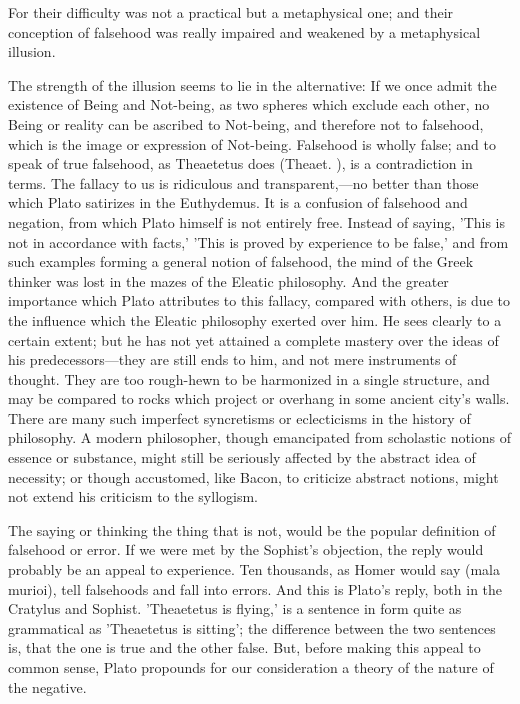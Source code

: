 \documentclass[11pt,letter]{article}
\begin{document}
\par  For their difficulty was not a practical but a metaphysical one; and their conception of falsehood was really impaired and weakened by a metaphysical illusion.

\par  The strength of the illusion seems to lie in the alternative: If we once admit the existence of Being and Not-being, as two spheres which exclude each other, no Being or reality can be ascribed to Not-being, and therefore not to falsehood, which is the image or expression of Not-being. Falsehood is wholly false; and to speak of true falsehood, as Theaetetus does (Theaet. ), is a contradiction in terms. The fallacy to us is ridiculous and transparent,—no better than those which Plato satirizes in the Euthydemus. It is a confusion of falsehood and negation, from which Plato himself is not entirely free. Instead of saying, 'This is not in accordance with facts,' 'This is proved by experience to be false,' and from such examples forming a general notion of falsehood, the mind of the Greek thinker was lost in the mazes of the Eleatic philosophy. And the greater importance which Plato attributes to this fallacy, compared with others, is due to the influence which the Eleatic philosophy exerted over him. He sees clearly to a certain extent; but he has not yet attained a complete mastery over the ideas of his predecessors—they are still ends to him, and not mere instruments of thought. They are too rough-hewn to be harmonized in a single structure, and may be compared to rocks which project or overhang in some ancient city's walls. There are many such imperfect syncretisms or eclecticisms in the history of philosophy. A modern philosopher, though emancipated from scholastic notions of essence or substance, might still be seriously affected by the abstract idea of necessity; or though accustomed, like Bacon, to criticize abstract notions, might not extend his criticism to the syllogism.

\par  The saying or thinking the thing that is not, would be the popular definition of falsehood or error. If we were met by the Sophist's objection, the reply would probably be an appeal to experience. Ten thousands, as Homer would say (mala murioi), tell falsehoods and fall into errors. And this is Plato's reply, both in the Cratylus and Sophist. 'Theaetetus is flying,' is a sentence in form quite as grammatical as 'Theaetetus is sitting'; the difference between the two sentences is, that the one is true and the other false. But, before making this appeal to common sense, Plato propounds for our consideration a theory of the nature of the negative.
\end{document}
